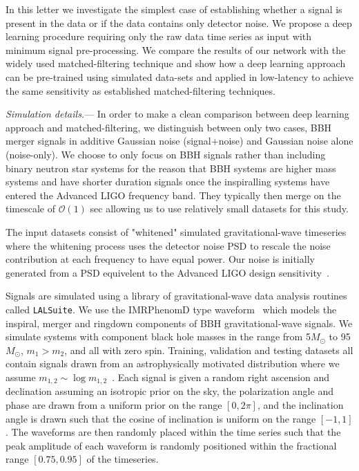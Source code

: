 \documentclass[%
showpacs,
 amsmath,amssymb,
 aps,
 twocolumn,
 prl,
 reprint,
floatfix,
]{revtex4-1}
\begin{document}
%
%
In this letter we investigate the simplest case of establishing whether a
signal is present in the data or if the data contains only detector noise. We
propose a deep learning procedure requiring only the raw data time series as
input with minimum signal pre-processing. We compare the results of our network
with the widely used matched-filtering technique and show how a deep learning
approach can be pre-trained using simulated data-sets and applied in
low-latency to {\color{red}achieve the same sensitivity as established
matched-filtering techniques.} 

%
%
\textit{Simulation details.}--- 
%
%
In order to make a clean comparison between deep learning approach and
matched-filtering, we distinguish between only two cases, \ac{BBH} merger
signals in additive Gaussian noise (signal+noise) and Gaussian noise alone
(noise-only). We choose to only focus on \ac{BBH} signals rather than including
binary neutron star systems for the reason that \ac{BBH} systems are higher
mass systems and have shorter duration signals once the inspiralling systems
have entered the Advanced LIGO frequency band. They typically then merge on the
timescale of $\mathcal{O}(1)$ sec allowing us to use relatively small datasets
for this study. 

%
%
The input datasets consist of "whitened" simulated gravitational-wave
timeseries where the whitening process uses the detector noise \ac{PSD} to  
rescale the noise contribution at each frequency to have equal power. 
Our noise is initially generated from a \ac{PSD} equivelent to the Advanced
LIGO design sensitivity~\cite{2016LRR....19....1A}. 

%
%
Signals are simulated using a library of gravitational-wave data analysis
routines called \texttt{LALSuite}. We use the IMRPhenomD type
waveform~\cite{PhysRevD.93.044006, PhysRevD.93.044007} which models the
inspiral, merger and ringdown components of \ac{BBH} gravitational-wave
signals. We simulate systems with component black hole masses in the range from
5\(M_\odot\) to 95\(M_\odot\), $m_{1} > m_{2}$, and all with zero spin.
Training, validation and testing datasets all contain signals drawn from an
astrophysically motivated distribution where we assume
$m_{1,2}\sim\log{m_{1,2}}$~\cite{PhysRevX.6.041015}. Each signal is given a
random right ascension and declination assuming an isotropic prior on the sky,
the polarization angle and phase are drawn from a uniform prior on the range
$[0,2\pi]$, and the inclination angle is drawn such that the cosine of
inclination is uniform on the range $[-1,1]$. The waveforms are then randomly
placed within the time series such that the peak amplitude of each waveform is
randomly positioned within the fractional range $[0.75,0.95]$ of the
timeseries. 
\end{document}
